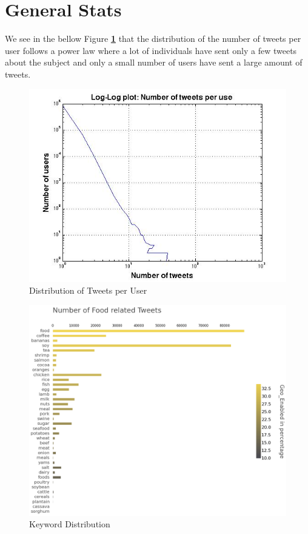 \documentclass[12pt]{report}
\begin{document}
\section{General Stats}

We see in the bellow Figure \textbf{\ref{fig:tpu}} that the distribution of the number of tweets per user follows a power law where a lot of individuals have sent only a few tweets about the subject and only a small number of users have sent a large amount of tweets. 


 
 \begin{figure}[H]
\centerline{ \noindent\includegraphics[width=1\textwidth]{img/anal/loglog_users_tweets}}
 \caption{Distribution of Tweets per User}
 \label{fig:tpu}
\end{figure}

  \begin{figure}[H]
\centerline{ \noindent\includegraphics[width=1\textwidth]{img/anal/n_food_tweets}}
 \caption{Keyword Distribution}
 \label{fig:keywordDistribution}
\end{figure}
 
\end{document}
